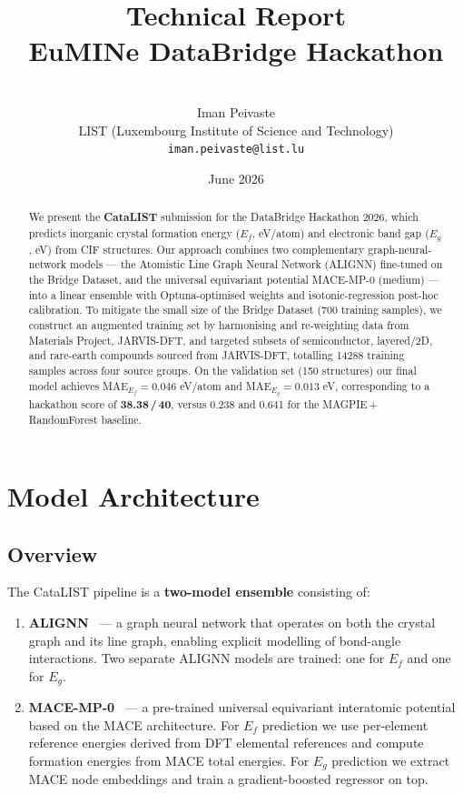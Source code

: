 \documentclass[10pt, a4paper]{article}
\title{%
  \textbf{Technical Report}\\[4pt]
  {\large EuMINe DataBridge Hackathon \hackathonyear}
}
\author{
  \teamname{CataLIST} \\[4pt]
  Iman Peivaste \\
  \small LIST (Luxembourg Institute of Science and Technology) \\
  \small \texttt{iman.peivaste@list.lu}
}
\date{June 2026}
\begin{document}
\maketitle
\thispagestyle{fancy}

\begin{abstract}
We present the \textbf{CataLIST} submission for the \eumine{} DataBridge
Hackathon 2026, which predicts inorganic crystal formation energy ($E_f$,
eV/atom) and electronic band gap ($E_g$, eV) from CIF structures.
Our approach combines two complementary graph-neural-network models —
the Atomistic Line Graph Neural Network (ALIGNN) fine-tuned on the
Bridge Dataset, and the universal equivariant potential MACE-MP-0
(medium) — into a linear ensemble with Optuna-optimised weights and
isotonic-regression post-hoc calibration.
To mitigate the small size of the Bridge Dataset (700 training samples),
we construct an augmented training set by harmonising and re-weighting
data from Materials Project, JARVIS-DFT, and targeted subsets of
semiconductor, layered/2D, and rare-earth compounds sourced from
JARVIS-DFT, totalling \num{14288} training samples across four
source groups.
On the validation set (150 structures) our final model achieves
MAE$_{E_f} = 0.046$ eV/atom and MAE$_{E_g} = 0.013$ eV,
corresponding to a hackathon score of \textbf{38.38\,/\,40},
versus 0.238 and 0.641 for the MAGPIE\,+\,RandomForest baseline.
\end{abstract}

\tableofcontents
\vspace{1em}

\section{Model Architecture}

\subsection{Overview}

The CataLIST pipeline is a \textbf{two-model ensemble} consisting of:

\begin{enumerate}
  \item \textbf{ALIGNN}~\cite{choudhary2021atomistic} — a graph neural
    network that operates on both the crystal graph and its line graph,
    enabling explicit modelling of bond-angle interactions.
    Two separate ALIGNN models are trained: one for $E_f$ and one
    for $E_g$.

  \item \textbf{MACE-MP-0}~\cite{batatia2023mace} — a pre-trained
    universal equivariant interatomic potential based on the MACE
    architecture.
    For $E_f$ prediction we use per-element reference energies derived
    from DFT elemental references and compute formation energies from
    MACE total energies.
    For $E_g$ prediction we extract MACE node embeddings and train a
    gradient-boosted regressor on top.
\end{enumerate}
\end{document}
